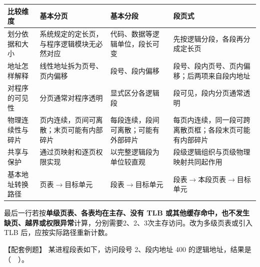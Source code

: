 \begin{wideblock}

\par\medskip\noindent\begin{minipage}{\linewidth}\fontsize{9.3}{12}\selectfont\begin{tabularx}{\linewidth}{@{}YYYY@{}}
\toprule\noalign{}
\begin{minipage}[b]{\linewidth}\raggedright
比较维度
\end{minipage} & \begin{minipage}[b]{\linewidth}\raggedright
基本分页
\end{minipage} & \begin{minipage}[b]{\linewidth}\raggedright
基本分段
\end{minipage} & \begin{minipage}[b]{\linewidth}\raggedright
段页式
\end{minipage} \\
\midrule\noalign{}


划分依据和大小 & 系统规定的定长页，与程序逻辑模块无必然对应 & 代码、数据等逻辑单位，段长可变 & 先按逻辑分段，各段再分成定长页 \\
地址怎样解释 & 线性地址拆为页号、页内偏移 & 段号、段内偏移 & 段号、段内页号、页内偏移；后两项来自段内地址 \\
对程序的可见性 & 分页通常对程序透明 & 显式区分各逻辑段 & 段可见，段内分页通常透明 \\
物理连续性与碎片 & 页内连续，页间可离散；末页可能有内部碎片 & 每段连续，段间可离散；可能有外部碎片 & 每页内连续，同一段可跨离散页框；各段末页可能有内部碎片 \\
共享与保护 & 通过页映射和逐页权限实现 & 以完整逻辑段为单位较直观 & 段级逻辑组织与页级物理映射共同起作用 \\
基本地址转换路径 & 页表\ensuremath{\to}目标单元 & 段表\ensuremath{\to}目标单元 & 段表\ensuremath{\to}本段页表\ensuremath{\to}目标单元 \\
\bottomrule\end{tabularx}
\end{minipage}\par\medskip

\end{wideblock}

最后一行若按\textbf{单级页表、各表均在主存、没有 TLB 或其他缓存命中，也不发生缺页、越界或权限异常}计算，分别需要2、2、3次主存访问。改为多级页表或引入 TLB 后，应按实际路径重新计数。

【配套例题】 某进程段表如下，访问段号 2、段内地址 400 的逻辑地址，结果是（　）。

